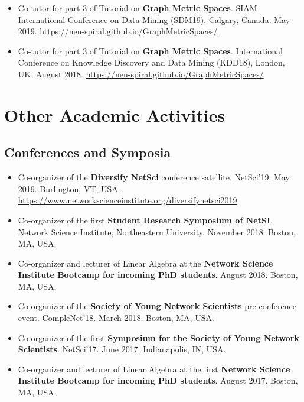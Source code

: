 \documentclass[12pt,]{scrartcl}
\begin{document}
\begin{itemize}
\leftskip-0.25in

\item Co-tutor for part 3 of Tutorial on \textbf{Graph Metric Spaces}. SIAM International Conference on Data Mining (SDM19), Calgary, Canada. May 2019. \url{https://neu-spiral.github.io/GraphMetricSpaces/}

\item Co-tutor for part 3 of Tutorial on \textbf{Graph Metric Spaces}. International Conference on Knowledge Discovery and Data Mining (KDD18), London, UK. August 2018. \url{https://neu-spiral.github.io/GraphMetricSpaces/}

\end{itemize}


\section{Other Academic Activities}\label{academic-activities}

\subsection{Conferences and Symposia}\label{conferences}

\begin{itemize}
\leftskip-0.25in

\item Co-organizer of the \textbf{Diversify NetSci} conference satellite. NetSci'19. May 2019. Burlington, VT, USA. \url{https://www.networkscienceinstitute.org/diversifynetsci2019}

\item Co-organizer of the first \textbf{Student Research Symposium of NetSI}. Network Science Institute, Northeastern University. November 2018. Boston, MA, USA.

\item Co-organizer and lecturer of Linear Algebra at the \textbf{Network Science Institute Bootcamp for incoming PhD students}. August 2018. Boston, MA, USA.

\item Co-organizer of the \textbf{Society of Young Network Scientists} pre-conference event. CompleNet'18. March 2018. Boston, MA, USA.

\item Co-organizer of the first \textbf{Symposium for the Society of Young Network Scientists}. NetSci'17. June 2017. Indianapolis, IN, USA.

\item Co-organizer and lecturer of Linear Algebra at the first \textbf{Network Science Institute Bootcamp for incoming PhD students}. August 2017. Boston, MA, USA.

\end{itemize}
\end{document}
